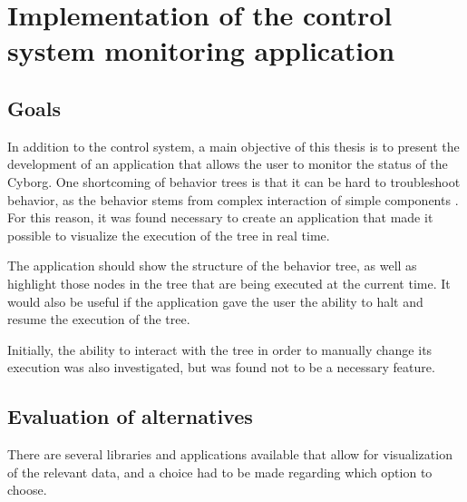 \documentclass[\rootfolder/main.tex]{subfiles}
\begin{document}
\chapter{Implementation of the control system monitoring application} %

\label{ch:implementation-monitoring} %


\section{Goals}

In addition to the control system, a main objective of this thesis is to present the development of an application that allows the user to monitor the status of the Cyborg.
One shortcoming of behavior trees is that it can be hard to troubleshoot behavior, as the behavior stems from complex interaction of simple components \cite{Millington2009}.
For this reason, it was found necessary to create an application that made it possible to visualize the execution of the tree in real time.

The application should show the structure of the behavior tree, as well as highlight those nodes in the tree that are being executed at the current time.
It would also be useful if the application gave the user the ability to halt and resume the execution of the tree.

Initially, the ability to interact with the tree in order to manually change its execution was also investigated, but was found not to be a necessary feature.


\section{Evaluation of alternatives}

There are several libraries and applications available that allow for visualization of the relevant data, and a choice had to be made regarding which option to choose.
\end{document}
